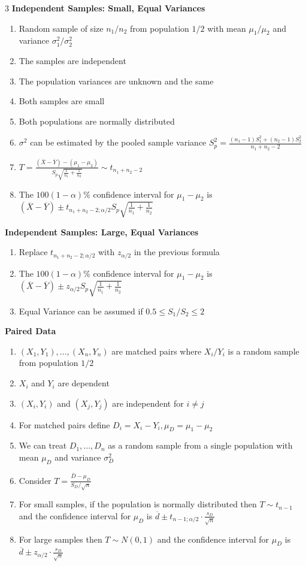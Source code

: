 \documentclass[10pt, landscape]{article}
\begin{document}
\begin{multicols*}{3}
\textbf{Independent Samples: Small, Equal Variances}
\begin{enumerate}
    \item Random sample of size $n_1/n_2$ from population $1/2$ with mean $\mu_1/\mu_2$ and variance $\sigma_1^2/\sigma_2^2$
    \item The samples are independent
    \item The population variances are unknown and the same
    \item Both samples are small
    \item Both populations are normally distributed
    \item $\sigma^2$ can be estimated by the pooled sample variance $S_p^2=\frac{(n_1-1)S_1^2+(n_2-1)S_2^2}{n_1+n_2-2}$
    \item $T=\frac{(\overline{X}-\overline{Y})-(\mu_1-\mu_2)}{S_p\sqrt{\frac{1}{n_1}+\frac{1}{n_2}}}\sim t_{n_1+n_2-2}$
    \item The $100(1-\alpha)\%$ confidence interval for $\mu_1-\mu_2$ is $(\overline{X}-\overline{Y})\pm t_{n_1+n_2-2;\alpha/2}S_p\sqrt{\frac{1}{n_1}+\frac{1}{n_2}}$
\end{enumerate}

\textbf{Independent Samples: Large, Equal Variances}
\begin{enumerate}
    \item Replace $t_{n_1+n_2-2;\alpha/2}$ with $z_{\alpha/2}$ in the previous formula
    \item The $100(1-\alpha)\%$ confidence interval for $\mu_1-\mu_2$ is $(\overline{X}-\overline{Y})\pm z_{\alpha/2}S_p\sqrt{\frac{1}{n_1}+\frac{1}{n_2}}$
    \item Equal Variance can be assumed if $0.5 \leq S_1/S_2 \leq 2$
\end{enumerate}

\textbf{Paired Data}
\begin{enumerate}
    \item $(X_1, Y_1),...,(X_n,Y_n)$ are matched pairs where $X_i/Y_i$ is a random sample from population $1/2$
    \item $X_i$ and $Y_i$ are dependent
    \item $(X_i,Y_i)$ and $(X_j,Y_j)$ are independent for $i\neq j$
    \item For matched pairs define $D_i=X_i-Y_i, \mu_D=\mu_1-\mu_2$
    \item We can treat $D_1,...,D_n$ as a random sample from a single population with mean $\mu_D$ and variance $\sigma_D^2$
    \item Consider $T=\frac{\overline{D}-\mu_D}{S_D / \sqrt{n}}$
    \item For small samples, if the population is normally distributed then $T\sim t_{n-1}$ and the confidence interval for $\mu_D$ is $\overline{d}\pm t_{n-1;\alpha/2}\cdot \frac{s_D}{\sqrt{n}}$
    \item For large samples then $T\sim N(0, 1)$ and the confidence interval for $\mu_D$ is $\overline{d}\pm z_{\alpha/2}\cdot \frac{s_D}{\sqrt{n}}$
\end{enumerate}


\end{multicols*}
\end{document}
